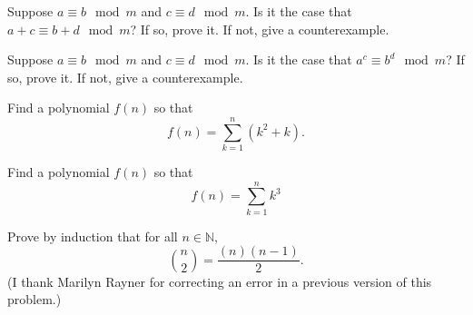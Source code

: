 \documentclass[12pt]{midterm}
\begin{document}
\begin{exam}
\begin{problem}[360]
  Suppose $a \equiv b \mod m$ and $c \equiv d \mod m$.  Is it the case
  that $a+c \equiv b+d \mod m$?  If so, prove it.  If not, give a
  counterexample.
\end{problem}

\begin{solution}\begin{solutiontext}
\end{solutiontext}\end{solution}

\begin{problem}[360]
  Suppose $a \equiv b \mod m$ and $c \equiv d \mod m$.  Is it the case
  that $a^c \equiv b^d \mod m$?  If so, prove it.  If not, give a
  counterexample.
\end{problem}

\begin{solution}\begin{solutiontext}
\end{solutiontext}\end{solution}

\begin{problem}[360]
Find a polynomial $f(n)$ so that
$$
f(n) = \sum_{k=1}^n \left( k^2 + k \right).
$$
\end{problem}

\begin{solution}\begin{solutiontext}
\end{solutiontext}\end{solution}

\begin{problem}[360]
Find a polynomial $f(n)$ so that
$$
f(n) = \sum_{k=1}^n k^3
$$
\end{problem}

\begin{solution}\begin{solutiontext}
\end{solutiontext}\end{solution}

\begin{problem}[360]
Prove by induction that for all $n \in \mathbb{N}$,
$$
\binom{n}{2} = \frac{(n)(n-1)}{2}.
$$
(I thank Marilyn Rayner for correcting an error in a previous version of this problem.)
\end{problem}


\end{exam}
\end{document}
